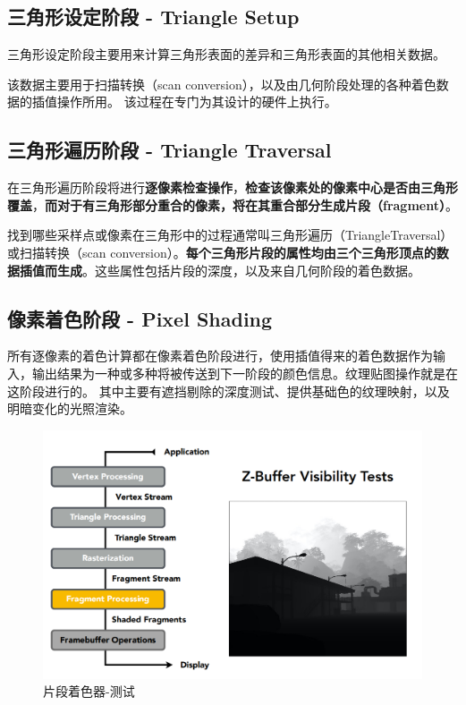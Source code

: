 \documentclass[UTF8,a4paper,12pt]{ctexbook}
\begin{document}
			\subsection{三角形设定阶段 - Triangle Setup}
				三角形设定阶段主要用来计算三角形表面的差异和三角形表面的其他相关数据。
				
				该数据主要用于扫描转换（scan conversion），以及由几何阶段处理的各种着色数据的插值操作所用。 该过程在专门为其设计的硬件上执行。
				 
			\subsection{三角形遍历阶段 - Triangle Traversal}
				在三角形遍历阶段将进行\textbf{逐像素检查操作}，\textbf{检查该像素处的像素中心是否由三角形覆盖}，\textbf{而对于有三角形部分重合的像素，将在其重合部分生成片段（fragment）}。
				
				找到哪些采样点或像素在三角形中的过程通常叫三角形遍历（TriangleTraversal）或扫描转换（scan conversion）。\textbf{每个三角形片段的属性均由三个三角形顶点的数据插值而生成}。这些属性包括片段的深度，以及来自几何阶段的着色数据。

			\subsection{像素着色阶段 - Pixel Shading}
				所有逐像素的着色计算都在像素着色阶段进行，使用插值得来的着色数据作为输入，输出结果为一种或多种将被传送到下一阶段的颜色信息。纹理贴图操作就是在这阶段进行的。 其中主要有遮挡剔除的深度测试、提供基础色的纹理映射，以及明暗变化的光照渲染。
				
				\begin{figure}[H]
					\centering
					\includegraphics[scale=0.57]{Fragment-Test}
					\caption{片段着色器-测试}
				\end{figure}
				
\end{document}
